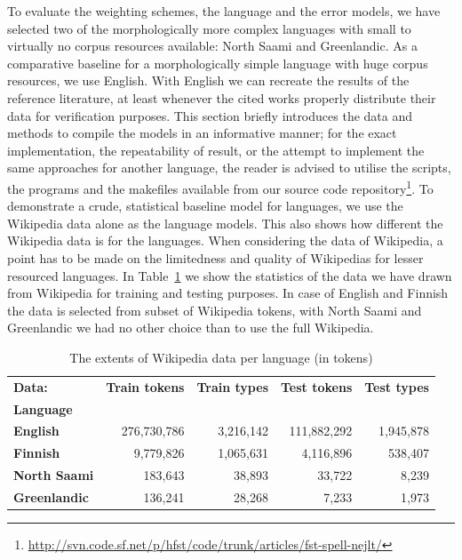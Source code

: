 \documentclass[a4paper,12pt]{article}
\begin{document}
To evaluate the weighting schemes, the language and the error models, we have
selected two of the morphologically more complex languages with small to
virtually no corpus resources available: North Saami and Greenlandic.  As a
comparative baseline for a morphologically simple language with huge corpus
resources, we use English.  With English we can recreate the results of the
reference literature, at least whenever the cited works properly distribute
their data for verification purposes. This section briefly introduces the data
and methods to compile the models in an informative manner; for the exact
implementation, the repeatability of result, or the attempt to implement the
same approaches for another language, the reader is advised to utilise the
scripts, the programs and the makefiles available from our source code
repository\footnote{\url{http://svn.code.sf.net/p/hfst/code/trunk/articles/fst-spell-nejlt/}}.
To demonstrate a crude, statistical baseline model for languages, we use the
Wikipedia data alone as the language models. This also shows how different the
Wikipedia data is for the languages.
When considering the data of Wikipedia, a point has to be made on the
limitedness and quality of Wikipedias for lesser resourced languages. In
Table~\ref{table:wikipedia-data} we show the statistics of the data we have
drawn from Wikipedia for training and testing purposes. In case of English
and Finnish the data is selected from subset of Wikipedia tokens, with North
Saami and Greenlandic we had no other choice than to use the full Wikipedia.

\begin{table}
    \centering
    \begin{tabular}{|l|r|r|r|r|}
        \hline
        \bf Data:       & \bf Train tokens & \bf Train types & \bf Test tokens & \bf Test types \\
        \bf Language    &             &           &             &  \\
        \hline
        \bf English     & 276,730,786 & 3,216,142 & 111,882,292 & 1,945,878 \\
        \hline
        \bf Finnish     & 9,779,826   & 1,065,631 & 4,116,896   & 538,407 \\
        \hline
        \bf North Saami & 183,643     & 38,893    & 33,722      & 8,239 \\
        \hline
        \bf Greenlandic & 136,241     & 28,268    & 7,233       & 1,973 \\
        \hline
    \end{tabular}
    \caption{The extents of Wikipedia data per language (in tokens)
    \label{table:wikipedia-data}}
\end{table}
\end{document}
